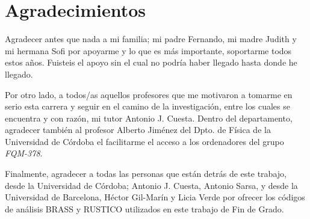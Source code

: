 
\pagestyle{fancy} 

\chapter*{Agradecimientos}

Agradecer antes que nada a mi familia; mi padre Fernando, mi madre Judith y mi hermana Sofi por apoyarme y lo que es más importante, soportarme todos estos años. Fuisteis el apoyo sin el cual no podría haber llegado hasta donde he llegado.

Por otro lado, a todos/as aquellos profesores que me motivaron a tomarme en serio esta carrera y seguir en el camino de la investigación, entre los cuales se encuentra y con razón, mi tutor Antonio J. Cuesta. Dentro del departamento, agradecer también al profesor Alberto Jiménez del Dpto. de Física de la Universidad de Córdoba el facilitarme el acceso a los ordenadores del grupo \textit{FQM-378}.

Finalmente, agradecer a todas las personas que están detrás de este trabajo, desde la Universidad de Córdoba; Antonio J. Cuesta, Antonio Sarsa, y desde la Universidad de Barcelona, Héctor Gil-Marín y Licia Verde por ofrecer los códigos de análisis BRASS y RUSTICO utilizados en este trabajo de Fin de Grado.
